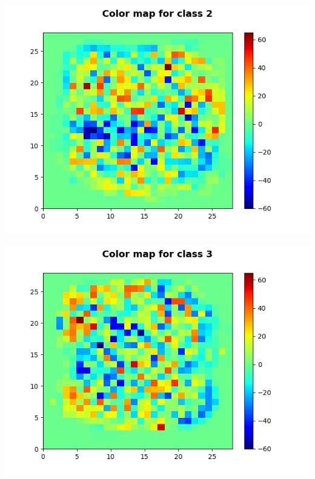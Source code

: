 \documentclass[11pt]{article}
\begin{document}
\begin{center}
\includegraphics[scale=0.80]{part1.ec2/digit2.png}
\end{center}

\begin{center}
\includegraphics[scale=0.80]{part1.ec2/digit3.png}
\end{center}
\end{document}
